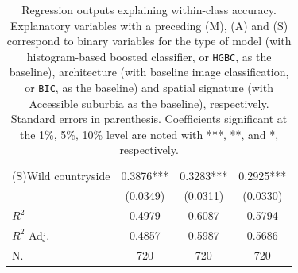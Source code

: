 \begin{table}
\begin{tabular}{lccc}
(S)Wild countryside                               &   0.3876*** &   0.3283*** &   0.2925*** \\
                                                  &    (0.0349) &    (0.0311) &    (0.0330) \\
\midrule
$R^2$                                             &      0.4979 &      0.6087 &      0.5794 \\
$R^2$ Adj.                                        &      0.4857 &      0.5987 &      0.5686 \\
N.                                                &      720    &      720    &      720    \\
\bottomrule
\end{tabular}
    \caption{\label{tab:non_sp_reg_wc}\footnotesize Regression outputs explaining
            within-class accuracy. Explanatory variables with a preceding (M),
            (A) and (S)
    correspond to binary variables for the type of model (with histogram-based
            boosted classifier, or \texttt{HGBC}, as the
    baseline), architecture (with baseline image classification, or
    \texttt{BIC}, as the baseline) and spatial signature (with Accessible
    suburbia as the baseline),
    respectively. Standard errors in parenthesis. Coefficients significant at
    the 1\%, 5\%, 10\% level are noted with ***, **, and *, respectively.}
\end{table}



